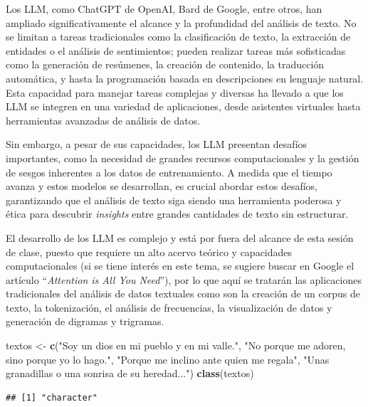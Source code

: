 \documentclass[
]{article}
\newenvironment{Shaded}{\begin{snugshade}}{\end{snugshade}}
\newcommand{\FunctionTok}[1]{\textcolor[rgb]{0.13,0.29,0.53}{\textbf{#1}}}
\newcommand{\NormalTok}[1]{#1}
\newcommand{\OtherTok}[1]{\textcolor[rgb]{0.56,0.35,0.01}{#1}}
\newcommand{\StringTok}[1]{\textcolor[rgb]{0.31,0.60,0.02}{#1}}
\begin{document}
Los LLM, como ChatGPT de OpenAI, Bard de Google, entre otros, han
ampliado significativamente el alcance y la profundidad del análisis de
texto. No se limitan a tareas tradicionales como la clasificación de
texto, la extracción de entidades o el análisis de sentimientos; pueden
realizar tareas más sofisticadas como la generación de resúmenes, la
creación de contenido, la traducción automática, y hasta la programación
basada en descripciones en lenguaje natural. Esta capacidad para manejar
tareas complejas y diversas ha llevado a que los LLM se integren en una
variedad de aplicaciones, desde asistentes virtuales hasta herramientas
avanzadas de análisis de datos.

Sin embargo, a pesar de sus capacidades, los LLM presentan desafíos
importantes, como la necesidad de grandes recursos computacionales y la
gestión de sesgos inherentes a los datos de entrenamiento. A medida que
el tiempo avanza y estos modelos se desarrollan, es crucial abordar
estos desafíos, garantizando que el análisis de texto siga siendo una
herramienta poderosa y ética para descubrir \emph{insights} entre
grandes cantidades de texto sin estructurar.

El desarrollo de los LLM es complejo y está por fuera del alcance de
esta sesión de clase, puesto que requiere un alto acervo teórico y
capacidades computacionales (si se tiene interés en este tema, se
sugiere buscar en Google el artículo ``\emph{Attention is All You
Need}''), por lo que aquí se tratarán las aplicaciones tradicionales del
análisis de datos textuales como son la creación de un corpus de texto,
la tokenización, el análisis de frecuencias, la visualización de datos y
generación de digramas y trigramas.

\begin{Shaded}
\begin{Highlighting}[]
\NormalTok{textos }\OtherTok{\textless{}{-}} \FunctionTok{c}\NormalTok{(}\StringTok{"Soy un dios en mi pueblo y en mi valle."}\NormalTok{, }
            \StringTok{"No porque me adoren, sino porque yo lo hago."}\NormalTok{, }
            \StringTok{"Porque me inclino ante quien me regala"}\NormalTok{,}
            \StringTok{"Unas granadillas o una sonrisa de su heredad..."}\NormalTok{)}
\FunctionTok{class}\NormalTok{(textos)}
\end{Highlighting}
\end{Shaded}

\begin{verbatim}
## [1] "character"
\end{verbatim}
\end{document}
